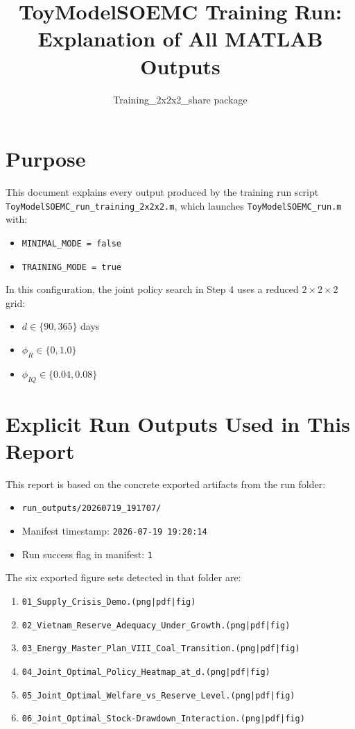 \documentclass[11pt]{article}
\title{ToyModelSOEMC Training Run: Explanation of All MATLAB Outputs}
\author{Training\_2x2x2\_share package}
\date{}
\begin{document}
\maketitle

\section{Purpose}
This document explains every output produced by the training run script
\texttt{ToyModelSOEMC\_run\_training\_2x2x2.m}, which launches
\texttt{ToyModelSOEMC\_run.m} with:
\begin{itemize}
\item \texttt{MINIMAL\_MODE = false}
\item \texttt{TRAINING\_MODE = true}
\end{itemize}

In this configuration, the joint policy search in Step 4 uses a reduced
$2 \times 2 \times 2$ grid:
\begin{itemize}
\item $d \in \{90, 365\}$ days
\item $\phi_R \in \{0, 1.0\}$
\item $\phi_{IQ} \in \{0.04, 0.08\}$
\end{itemize}

\section{Explicit Run Outputs Used in This Report}
This report is based on the concrete exported artifacts from the run folder:

\begin{itemize}
\item \texttt{run\_outputs/20260719\_191707/}
\item Manifest timestamp: \texttt{2026-07-19 19:20:14}
\item Run success flag in manifest: \texttt{1}
\end{itemize}

The six exported figure sets detected in that folder are:
\begin{enumerate}
\item \texttt{01\_Supply\_Crisis\_Demo.(png|pdf|fig)}
\item \texttt{02\_Vietnam\_Reserve\_Adequacy\_Under\_Growth.(png|pdf|fig)}
\item \texttt{03\_Energy\_Master\_Plan\_VIII\_Coal\_Transition.(png|pdf|fig)}
\item \texttt{04\_Joint\_Optimal\_Policy\_Heatmap\_at\_d.(png|pdf|fig)}
\item \texttt{05\_Joint\_Optimal\_Welfare\_vs\_Reserve\_Level.(png|pdf|fig)}
\item \texttt{06\_Joint\_Optimal\_Stock-Drawdown\_Interaction.(png|pdf|fig)}
\end{enumerate}
\end{document}
